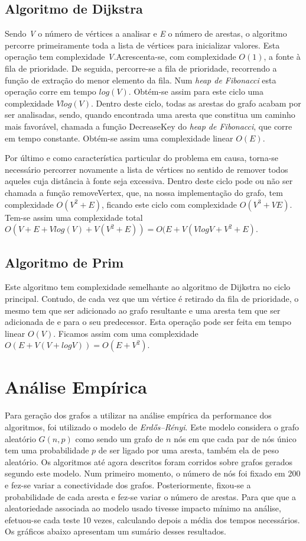 \documentclass[a4paper,12pt,titlepage]{article}
\begin{document}
\subsection{Algoritmo de Dijkstra}
Sendo \emph{V} o número de vértices a analisar e \emph{E} o número de arestas, o algoritmo percorre primeiramente toda a lista de vértices para inicializar valores. Esta operação tem complexidade \emph{V}.Acrescenta-se, com complexidade $O(1)$, a fonte à fila de prioridade. De seguida, percorre-se a fila de prioridade, recorrendo a função de extração do menor elemento da fila. Num \emph{heap de Fibonacci} esta operação corre em tempo $log(V)$. Obtém-se assim para este ciclo uma complexidade $Vlog(V)$. Dentro deste ciclo, todas as arestas do grafo acabam por ser analisadas, sendo, quando encontrada uma aresta que constitua um caminho mais favorável, chamada a função DecreaseKey do \emph{heap de Fibonacci}, que corre em tempo constante. Obtém-se assim uma complexidade linear $O(E)$.

Por último e como característica particular do problema em causa, torna-se necessário percorrer novamente a lista de vértices no sentido de remover todos aqueles cuja distância à fonte seja excessiva. Dentro deste ciclo pode ou não ser chamada a função removeVertex, que, na nossa implementação do grafo, tem complexidade $O(V^2+ E)$, ficando este ciclo com complexidade $O(V^3+VE)$. Tem-se assim uma complexidade total $O(V+E+Vlog(V)+V(V^2+E)) = O(E+V(VlogV+V^2+E)$.

\subsection{Algoritmo de Prim}
Este algoritmo tem complexidade semelhante ao algoritmo de Dijkstra no ciclo principal. Contudo, de cada vez que um vértice é retirado da fila de prioridade, o mesmo tem que ser adicionado ao grafo resultante e uma aresta tem que ser adicionada de e para o seu predecessor. Esta operação pode ser feita em tempo linear $O(V)$. Ficamos assim com uma complexidade $O(E+V(V+ logV))=O(E+V^2)$.

\section{Análise Empírica}
Para geração dos grafos a utilizar na análise empírica da performance dos algoritmos, foi utilizado o modelo de \emph{Erdős–Rényi}. Este modelo considera o grafo aleatório $G(n,p)$ como sendo um grafo de $n$ nós em que cada par de nós único tem uma probabilidade $p$ de ser ligado por uma aresta, também ela de peso aleatório. Os algoritmos até agora descritos foram corridos sobre grafos gerados segundo este modelo. Num primeiro momento, o número de nós foi fixado em 200 e fez-se variar a conectividade dos grafos. Posteriormente, fixou-se a probabilidade de cada aresta e fez-se variar o número de arestas. Para que que a aleatoriedade associada ao modelo usado tivesse impacto mínimo na análise, efetuou-se cada teste 10 vezes, calculando depois a média dos tempos necessários. Os gráficos abaixo apresentam um sumário desses resultados.
\newpage
\end{document}
